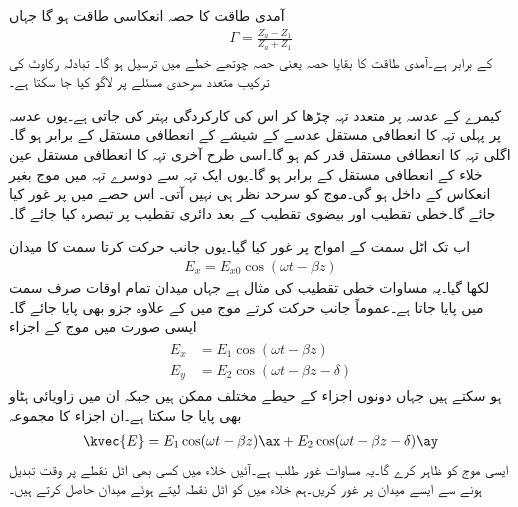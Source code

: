 آمدی طاقت کا  حصہ انعکاسی طاقت ہو گا جہاں
\begin{align}
\Gamma=\frac{Z_a-Z_1}{Z_a+Z_1}
\end{align}
کے برابر ہے۔آمدی طاقت کا بقایا حصہ یعنی  حصہ چوتھے خطے میں ترسیل ہو گا۔ تبادلہ رکاوٹ کی ترکیب متعدد سرحدی مسئلے پر لاگو کیا جا سکتا ہے۔

کیمرے کے عدسہ پر متعدد تہہ چڑھا کر اس کی کارکردگی بہتر کی جاتی ہے۔یوں عدسہ پر پہلی تہہ کا انعطافی مستقل عدسے کے شیشے کے انعطافی مستقل کے برابر ہو گا۔اگلی تہہ کا انعطافی مستقل قدر کم ہو گا۔اسی طرح آخری تہہ کا انعطافی مستقل عین خلاء کے انعطافی مستقل کے برابر ہو گا۔یوں ایک تہہ سے دوسرے تہہ میں موج بغیر انعکاس کے داخل ہو گی۔موج کو سرحد نظر ہی نہیں آتی۔  
اس حصے میں   پر غور کیا جائے گا۔خطی تقطیب اور بیضوی تقطیب کے بعد دائری تقطیب پر تبصرہ کیا جائے گا۔

اب تک اٹل سمت کے امواج پر غور کیا گیا۔یوں  جانب حرکت کرتا  سمت کا میدان
\begin{align}
E_x = E_{x0} \cos (\omega t -\beta z)
\end{align}
لکھا گیا۔یہ مساوات خطی تقطیب کی مثال ہے جہاں میدان تمام اوقات صرف  سمت میں پایا جاتا ہے۔عموماً  جانب حرکت کرتے موج میں  کے علاوہ  جزو بھی پایا جائے گا۔ایسی صورت میں موج کے اجزاء
\begin{gather}
\begin{aligned}\label{مساوات_قطبیت_عمومی_اجزاء}
E_x&=E_1 \cos (\omega t -\beta z)\\
E_y&=E_2 \cos (\omega t -\beta z -\delta)
\end{aligned}
\end{gather}
ہو سکتے ہیں جہاں دونوں اجزاء کے حیطے مختلف ممکن ہیں جبکہ ان میں زاویائی ہٹاو  بھی پایا جا سکتا ہے۔ان اجزاء کا مجموعہ
\begin{align}\label{مساوات_قطبیت_عمومی_مساوات}
\kvec{E}=E_1 \cos (\omega t -\beta z) \ax+E_2 \cos (\omega t -\beta z -\delta) \ay
\end{align}
ایسی موج کو ظاہر کرے گا۔یہ مساوات غور طلب ہے۔آئیں خلاء میں کسی بھی اٹل نقطے پر وقت تبدیل ہونے سے  ایسے میدان پر غور کریں۔ہم خلاء میں   کو اٹل نقطہ لیتے ہوئے  میدان حاصل کرتے ہیں۔

